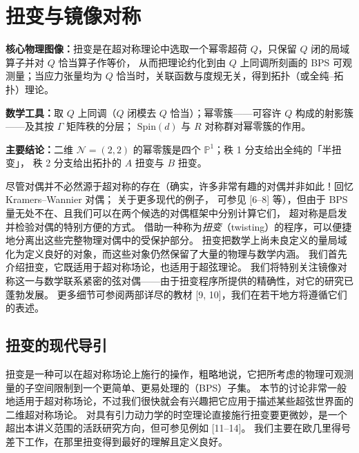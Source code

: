
\section{扭变与镜像对称}

\begin{keytakeaway}
\textbf{核心物理图像：}扭变是在超对称理论中选取一个幂零超荷 $Q$，只保留 $Q$ 闭的局域算子并对 $Q$ 恰当算子作等价，
从而把理论约化到由 $Q$ 上同调所刻画的 BPS 可观测量；当应力张量均为 $Q$ 恰当时，关联函数与度规无关，得到拓扑（或全纯–拓扑）理论。

\textbf{数学工具：}取 $Q$ 上同调（$Q$ 闭模去 $Q$ 恰当）；幂零簇——可容许 $Q$ 构成的射影簇——及其按 $\Gamma$ 矩阵秩的分层；
$\mathrm{Spin}(d)$ 与 $R$ 对称群对幂零簇的作用。

\textbf{主要结论：}二维 $\mathcal{N}=(2,2)$ 的幂零簇是四个 $\mathbb{P}^1$；秩 1 分支给出全纯的「半扭变」，
秩 2 分支给出拓扑的 $A$ 扭变与 $B$ 扭变。
\end{keytakeaway}

尽管对偶并不必然源于超对称的存在（确实，许多非常有趣的对偶并非如此！回忆 Kramers--Wannier 对偶；
关于更多现代的例子，%
可参见 [6--8] 等），但由于 BPS 量无处不在、且我们可以在两个候选的对偶框架中分别计算它们，
超对称是启发并检验对偶的特别方便的方式。
借助一种称为\emph{扭变}（twisting）的程序，可以便捷地分离出这些完整物理对偶中的受保护部分。
扭变把数学上尚未良定义的量局域化为定义良好的对象，而这些对象仍然保留了大量的物理与数学内涵。
我们首先介绍扭变，它既适用于超对称场论，也适用于超弦理论。
我们将特别关注镜像对称这一与数学联系紧密的弦对偶——由于扭变程序所提供的精确性，对它的研究已蓬勃发展。
更多细节可参阅两部详尽的教材 [9, 10]，我们在若干地方将遵循它们的表述。

\subsection{扭变的现代导引}

扭变是一种可以在超对称场论上施行的操作，粗略地说，它把所考虑的物理可观测量的子空间限制到一个更简单、更易处理的（BPS）子集。
本节的讨论非常一般地适用于超对称场论，不过我们很快就会有兴趣把它应用于描述某些超弦世界面的二维超对称场论。
对具有引力动力学的时空理论直接施行扭变要更微妙，是一个超出本讲义范围的活跃研究方向，但可参见例如 [11--14]。
我们主要在欧几里得号差下工作，在那里扭变得到最好的理解且定义良好。

